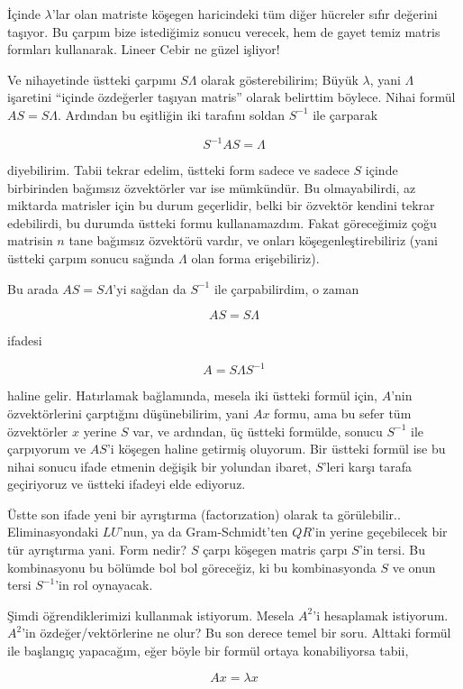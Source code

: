 \documentclass[12pt,fleqn]{article}\usepackage{../../common}
\begin{document}
İçinde $\lambda$'lar olan matriste köşegen haricindeki tüm diğer hücreler
sıfır değerini taşıyor. Bu çarpım bize istediğimiz sonucu verecek, hem de
gayet temiz matris formları kullanarak. Lineer Cebir ne güzel işliyor! 

Ve nihayetinde üstteki çarpımı $S\Lambda$ olarak gösterebilirim; Büyük
$\lambda$, yani $\Lambda$ işaretini ``içinde özdeğerler taşıyan matris''
olarak belirttim böylece. Nihai formül $AS = S\Lambda$. Ardından bu
eşitliğin iki tarafını soldan $S^{-1}$ ile çarparak

$$ S^{-1}AS = \Lambda $$

diyebilirim. Tabii tekrar edelim, üstteki form sadece ve sadece $S$ içinde
birbirinden bağımsız özvektörler var ise mümkündür. Bu olmayabilirdi, az
miktarda matrisler için bu durum geçerlidir, belki bir özvektör kendini
tekrar edebilirdi, bu durumda üstteki formu kullanamazdım. Fakat
göreceğimiz çoğu matrisin $n$ tane bağımsız özvektörü vardır, ve onları
köşegenleştirebiliriz (yani üstteki çarpım sonucu sağında $\Lambda$ olan
forma erişebiliriz).

Bu arada $AS=S\Lambda$'yi sağdan da $S^{-1}$ ile çarpabilirdim, o zaman 

$$AS=S\Lambda $$

ifadesi

$$ A = S \Lambda S^{-1} $$

haline gelir. Hatırlamak bağlamında, mesela iki üstteki formül için,
$A$'nin özvektörlerini çarptığını düşünebilirim, yani $Ax$ formu, ama bu
sefer tüm özvektörler $x$ yerine $S$ var, ve ardından, üç üstteki formülde,
sonucu $S^{-1}$ ile çarpıyorum ve $AS$'i köşegen haline getirmiş
oluyorum. Bir üstteki formül ise bu nihai sonucu ifade etmenin değişik bir
yolundan ibaret, $S$'leri karşı tarafa geçiriyoruz ve üstteki ifadeyi elde
ediyoruz.

Üstte son ifade yeni bir ayrıştırma (factorızation) olarak ta
görülebilir.. Eliminasyondaki $LU$'nun, ya da Gram-Schmidt'ten $QR$'in
yerine geçebilecek bir tür ayrıştırma yani. Form nedir? $S$ çarpı köşegen
matris çarpı $S$'in tersi. Bu kombinasyonu bu bölümde bol bol göreceğiz, ki
bu kombinasyonda $S$ ve onun tersi $S^{-1}$'in rol oynayacak.

Şimdi öğrendiklerimizi kullanmak istiyorum. Mesela $A^2$'i hesaplamak
istiyorum. $A^2$'in özdeğer/vektörlerine ne olur? Bu son derece temel bir
soru. Alttaki formül ile başlangıç yapacağım, eğer böyle bir formül ortaya
konabiliyorsa tabii, 

$$ Ax = \lambda x $$
\end{document}
